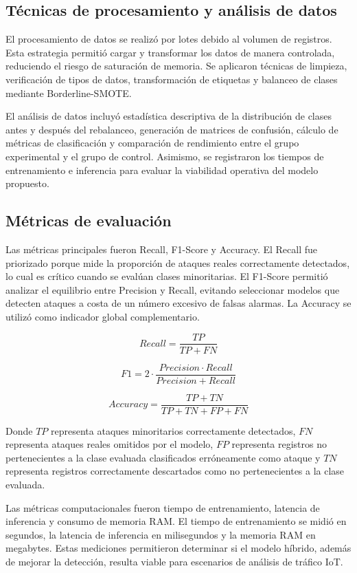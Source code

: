 \documentclass[12pt,a4paper]{article}
\begin{document}
\subsection{Técnicas de procesamiento y análisis de datos}

El procesamiento de datos se realizó por lotes debido al volumen de registros. Esta estrategia permitió cargar y transformar los datos de manera controlada, reduciendo el riesgo de saturación de memoria. Se aplicaron técnicas de limpieza, verificación de tipos de datos, transformación de etiquetas y balanceo de clases mediante Borderline-SMOTE.

El análisis de datos incluyó estadística descriptiva de la distribución de clases antes y después del rebalanceo, generación de matrices de confusión, cálculo de métricas de clasificación y comparación de rendimiento entre el grupo experimental y el grupo de control. Asimismo, se registraron los tiempos de entrenamiento e inferencia para evaluar la viabilidad operativa del modelo propuesto.

\subsection{Métricas de evaluación}

Las métricas principales fueron Recall, F1-Score y Accuracy. El Recall fue priorizado porque mide la proporción de ataques reales correctamente detectados, lo cual es crítico cuando se evalúan clases minoritarias. El F1-Score permitió analizar el equilibrio entre Precision y Recall, evitando seleccionar modelos que detecten ataques a costa de un número excesivo de falsas alarmas. La Accuracy se utilizó como indicador global complementario.

\[
Recall = \frac{TP}{TP+FN}
\]

\[
F1 = 2 \cdot \frac{Precision \cdot Recall}{Precision + Recall}
\]

\[
Accuracy = \frac{TP+TN}{TP+TN+FP+FN}
\]

Donde $TP$ representa ataques minoritarios correctamente detectados, $FN$ representa ataques reales omitidos por el modelo, $FP$ representa registros no pertenecientes a la clase evaluada clasificados erróneamente como ataque y $TN$ representa registros correctamente descartados como no pertenecientes a la clase evaluada.

Las métricas computacionales fueron tiempo de entrenamiento, latencia de inferencia y consumo de memoria RAM. El tiempo de entrenamiento se midió en segundos, la latencia de inferencia en milisegundos y la memoria RAM en megabytes. Estas mediciones permitieron determinar si el modelo híbrido, además de mejorar la detección, resulta viable para escenarios de análisis de tráfico IoT.
\end{document}
